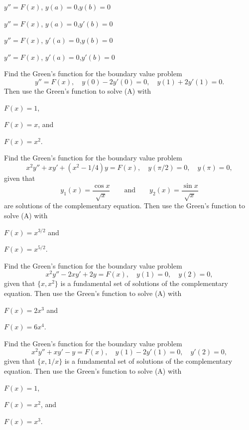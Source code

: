 \begin{exerciselist}
\begin{alist}
\item %
$y''=F(x)$, \quad $y(a)=0$,\quad $y(b)=0$

\item %
$y''=F(x)$, \quad $y(a)=0$,\quad $y'(b)=0$

\item %
$y''=F(x)$, \quad $y'(a)=0$,\quad $y(b)=0$

\item %
$y''=F(x)$, \quad $y'(a)=0$,\quad $y'(b)=0$
\end{alist}

\item\label{exer:13.1.22}Find the Green's function  for the boundary value problem
\[
y''=F(x), \quad y(0)-2y'(0)=0, \quad y(1)+2y'(1)=0.   \tag{A}
\]
Then  use the Green's function to solve (A) with
\begin{alist}[columns=3]
\item $F(x)=1$, \item $F(x)=x$, \quad and \item $F(x)=x^{2}$.
\end{alist}

\item\label{exer:13.1.23}Find the Green's function  for the boundary value problem
\[
x^{2}y''+xy'+(x^{2}-1/4)y=F(x), \quad y(\pi/2)=0,\quad y(\pi)=0,   \tag{A}
\]
given that
\[
y_{1}(x)=\frac{\cos x}{\sqrt{x}}\qquad\text{and}\qquad
y_{2}(x)=\frac{\sin x}{\sqrt{x}}
\]
are solutions of the complementary equation. Then use the Green's function
to solve  (A) with
\parbox{.7\linewidth}{\begin{alist*}[columns=2]
\item $F(x)=x^{3/2}$ \quad and
\item $F(x)=x^{5/2}$.
\end{alist*}}

\item\label{exer:13.1.24}Find the Green's function  for the boundary value problem
\[
x^{2}y''-2xy'+2y=F(x), \quad y(1)=0,\quad y(2)=0,   \tag{A}
\]
given that  $\{x,x^{2}\}$ is a fundamental set of solutions
of the complementary equation.
Then use the Green's function
to solve  (A) with
\parbox{.5\linewidth}{\begin{alist*}[columns=2]
\item $F(x)=2x^{3}$ and
\item $F(x)=6x^{4}$.
\end{alist*}}


\item\label{exer:13.1.25}Find the Green's function  for the boundary value problem
\[
x^{2}y''+xy'-y=F(x), \quad y(1)-2y'(1)=0,\quad y'(2)=0,   \tag{A}
\]
given that  $\{x,1/x\}$ is a fundamental set of solutions
of the complementary equation.
Then use the Green's function
to solve  (A) with
\begin{alist*}[columns=3]
\item $F(x)=1$,
\item $F(x)=x^{2}$, \quad and
\item $F(x)=x^{3}$.
\end{alist*}


\end{exerciselist}
